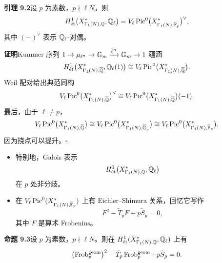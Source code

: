 \noindent\textbf{引理 9.2}\label{lem:9.2}\quad 设 $p$ 为素数，$p\nmid\ell N$。则
\[
H^1_{\mathrm{\acute{e}t}}\bigl(X^*_{\Gamma_1(N),\mathbb{Q}},\mathbb{Q}_\ell\bigr)=V_\ell\operatorname{Pic}^0\bigl(X^*_{\Gamma_1(N),\overline{\mathbb{F}}_p}\bigr)^\vee,
\]
其中 $(-)^\vee$ 表示 $\mathbb{Q}_\ell$-对偶。

\noindent\textbf{证明}\quad Kummer 序列 $1\to\mu_{\ell^n}\to\mathbb{G}_m\xrightarrow{\ell^n}\mathbb{G}_m\to1$ 蕴涵
\[
H^1_{\mathrm{\acute{e}t}}\bigl(X^*_{\Gamma_1(N),\overline{\mathbb{Q}}},\mathbb{Q}_\ell(1)\bigr)\cong V_\ell\operatorname{Pic}^0\bigl(X^*_{\Gamma_1(N),\overline{\mathbb{Q}}}\bigr).
\]
Weil 配对给出典范同构
\[
V_\ell\operatorname{Pic}^0\bigl(X^*_{\Gamma_1(N),\overline{\mathbb{Q}}}\bigr)^\vee\cong V_\ell\operatorname{Pic}^0\bigl(X^*_{\Gamma_1(N),\overline{\mathbb{Q}}}\bigr)(-1).
\]
最后，由于 $\ell\neq p$，
\[
V_\ell\operatorname{Pic}^0\bigl(X^*_{\Gamma_1(N),\overline{\mathbb{Q}}}\bigr)\cong V_\ell\operatorname{Pic}^0\bigl(X^*_{\Gamma_1(N),\overline{\mathbb{Q}}_p}\bigr)\cong V_\ell\operatorname{Pic}^0\bigl(X^*_{\Gamma_1(N),\overline{\mathbb{F}}_p}\bigr),
\]
因为挠点可以提升。\hfill$\square$

\begin{itemize}
\item 特别地，Galois 表示
\[
H^1_{\mathrm{\acute{e}t}}\bigl(X^*_{\Gamma_1(N),\mathbb{Q}},\mathbb{Q}_\ell\bigr)
\]
在 $p$ 处非分歧。
\item 在 $V_\ell\operatorname{Pic}^0(X^*_{\Gamma_1(N),\overline{\mathbb{F}}_p})$ 上有 Eichler--Shimura 关系，回忆它写作
\[
F^2-\tilde T_pF+p\tilde S_p=0,
\]
其中 $F$ 是算术 Frobenius。
\end{itemize}

\noindent\textbf{命题 9.3}\label{prop:9.3}\quad 设 $p$ 为素数，$p\nmid\ell N$。则在 $H^1_{\mathrm{\acute{e}t}}(X^*_{\Gamma_1(N),\mathbb{Q}},\mathbb{Q}_\ell)$ 上有
\[
\bigl(\operatorname{Frob}_p^{\mathrm{geom}}\bigr)^2-\tilde T_p\operatorname{Frob}_p^{\mathrm{geom}}+p\tilde S_p=0 .
\]

